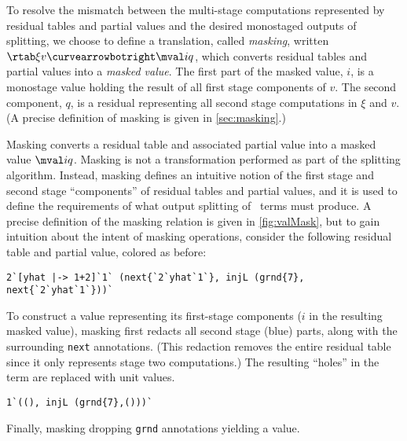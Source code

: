 \begin{abstrsyn}
To resolve the mismatch between the multi-stage computations
represented by residual tables and partial values and the desired
monostaged outputs of splitting, we choose to define a translation,
called {\em masking}, written $\rtab \xi v \vsplito \mval i q$, which
converts residual tables and partial values into a {\em masked value}.
The first part of the masked value, $i$, is a monostage value holding
the result of all first stage components of $v$.  The second
component, $q$, is a residual representing all second stage
computations in $\xi$ and $v$. (A precise definition of masking is
given in \ref{sec:masking}.)


Masking converts a residual table and associated partial value into a
masked value $\mval i q$.
Masking is not a transformation performed as part of the splitting
algorithm.  Instead, masking defines an intuitive notion of the first
stage and second stage ``components'' of residual tables and partial
values, and it is used to define the requirements of what output
splitting of \bbonem\ terms must produce.  A precise definition of the
masking relation is given in \ref{fig:valMask}, but to gain intuition
about the intent of masking operations, consider the following
residual table and partial value, colored as before:
\begin{lstlisting}
2`[yhat |-> 1+2]`1` (next{`2`yhat`1`}, injL (grnd{7}, next{`2`yhat`1`}))`
\end{lstlisting}
To construct a value representing its first-stage components ($i$ in
the resulting masked value), masking first redacts all second stage
(blue) parts, along with the surrounding \texttt{next}
annotations. (This redaction removes the entire residual table since
it only represents stage two computations.) The resulting ``holes'' in
the term are replaced with unit values.
\begin{lstlisting}
1`((), injL (grnd{7},()))`
\end{lstlisting}
Finally, masking dropping \texttt{grnd} annotations yielding a value.

\end{abstrsyn}
